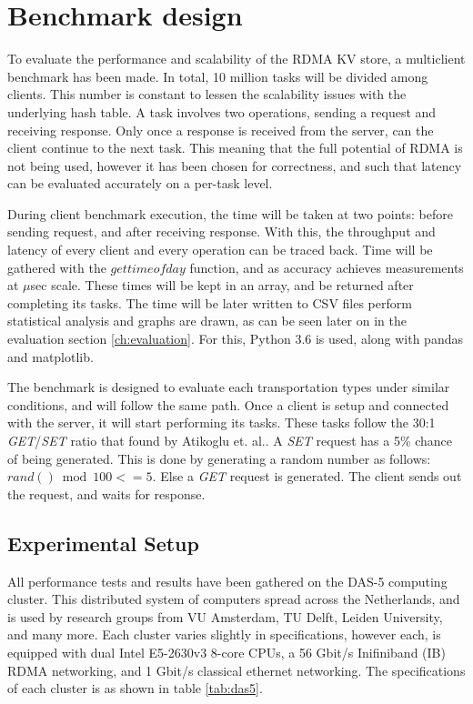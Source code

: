 

\section{Benchmark design}\label{sec:benchmark-design}
To evaluate the performance and scalability of the RDMA KV store, a multiclient benchmark has been made.
In total, 10 million tasks will be divided among clients.
This number is constant to lessen the scalability issues with the underlying hash table.
A task involves two operations, sending a request and receiving response.
Only once a response is received from the server, can the client continue to the next task.
This meaning that the full potential of RDMA is not being used, however it has been chosen for correctness, and such that latency can be evaluated accurately on a per-task level. %

During client benchmark execution, the time will be taken at two points: before sending request, and after receiving response.
With this, the throughput and latency of every client and every operation can be traced back.
Time will be gathered with the $gettimeofday$ function, and as accuracy achieves measurements at $\mu$sec scale.
These times will be kept in an array, and be returned after completing its tasks.
The time will be later written to CSV files perform statistical analysis and graphs are drawn, as can be seen later on in the evaluation section \ref{ch:evaluation}.
For this, Python 3.6\cite{python} is used, along with pandas\cite{pandas} and matplotlib\cite{matplotlib}.

The benchmark is designed to evaluate each transportation types under similar conditions, and will follow the same path.
Once a client is setup and connected with the server, it will start performing its tasks.
These tasks follow the 30:1 \textit{GET}/\textit{SET} ratio that found by Atikoglu et. al.\cite{atikoglu2012workload}.
A \textit{SET} request has a 5\% chance of being generated.
This is done by generating a random number as follows: $rand() \bmod 100 <= 5$.
Else a \textit{GET} request is generated.
The client sends out the request, and waits for response.

\subsection{Experimental Setup}\label{subsec:experimental-setup}
All performance tests and results have been gathered on the DAS-5 computing cluster\cite{das5}.
This distributed system of computers spread across the Netherlands, and is used by research groups from VU Amsterdam, TU Delft, Leiden University, and many more.
Each cluster varies slightly in specifications, however each, is equipped with dual Intel E5-2630v3 8-core CPUs, a 56 Gbit/s Inifiniband (IB) RDMA networking, and 1 Gbit/s classical ethernet networking.
The specifications of each cluster is as shown in table \ref{tab:das5}.

